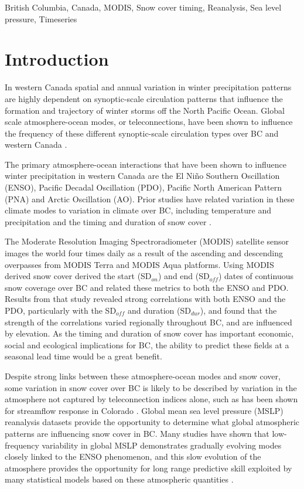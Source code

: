 \documentclass{tATO2e}
\newcommand{\sdoff}{SD$_{off}$}
\newcommand{\sdon}{SD$_{on}$}
\newcommand{\sddur}{SD$_{dur}$}
\begin{document}
\begin{keywords}
British Columbia, Canada, MODIS, Snow cover timing, Reanalysis, Sea level pressure, Timeseries
\end{keywords}


\section{Introduction}
In western Canada spatial and annual variation in winter precipitation patterns are highly dependent on synoptic-scale circulation patterns that influence the formation and trajectory of winter storms off the North Pacific Ocean. Global scale atmosphere-ocean modes, or teleconnections, have been shown to influence the frequency of these different synoptic-scale circulation types over BC and western Canada \citep{Stahl2006-og}.
\par
The primary atmosphere-ocean interactions that have been shown to influence winter precipitation in western Canada are the El Niño Southern Oscillation (ENSO), Pacific Decadal Oscillation (PDO), Pacific North American Pattern (PNA) and Arctic Oscillation (AO). Prior studies have related variation in these climate modes to variation in climate over BC, including temperature and precipitation \citep[e.g.,][]{Shabbar1996-oc, Mantua1997-ri} and the timing and duration of snow cover \citep[e.g.,][]{Moore1996-xr,Bevington2019}. 
\par
The Moderate Resolution Imaging Spectroradiometer (MODIS) satellite sensor images the world four times daily as a result of the ascending and descending overpasses from MODIS Terra and MODIS Aqua platforms. Using MODIS derived snow cover \cite{Bevington2019} derived the start (\sdon{}) and end (\sdoff{}) dates of continuous snow coverage over BC and related these metrics to both the ENSO and PDO. Results from that study revealed strong correlations with both ENSO and the PDO, particularly with the \sdoff{} and duration (\sddur{}), and found that the strength of the correlations varied regionally throughout BC, and are influenced by elevation. As the timing and duration of snow cover has important economic, social and ecological implications for BC, the ability to predict these fields at a seasonal lead time would be a great benefit.
\par
Despite strong links between these atmosphere-ocean modes and snow cover, some variation in snow cover over BC is likely to be described by variation in the atmosphere not captured by teleconnection indices alone, such as has been shown for streamflow response in Colorado \citep{Regonda2006}. Global mean sea level pressure (MSLP) reanalysis datasets provide the opportunity to determine what global atmospheric patterns are influencing snow cover in BC. Many studies have shown that low-frequency variability in global MSLP demonstrates gradually evolving modes closely linked to the ENSO phenomenon, and this slow evolution of the atmosphere provides the opportunity for long range predictive skill exploited by many statistical models based on these atmospheric quantities \citep{Latif1998}. 
\end{document}
